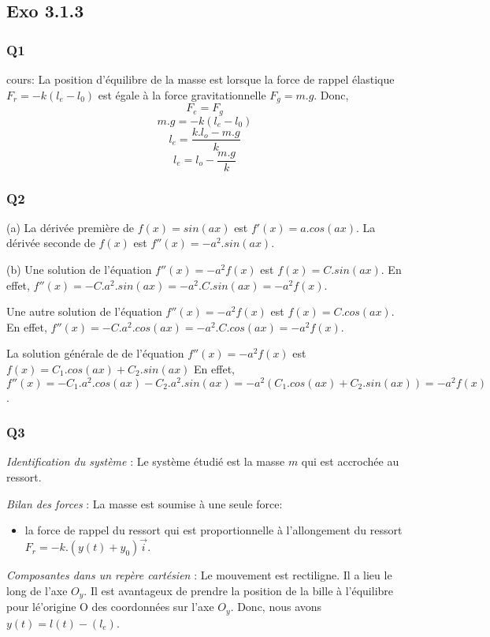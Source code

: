 \documentclass[]{book}
\theoremstyle{definition}
\begin{document}
\subsection*{Exo 3.1.3}
\subsubsection*{Q1}
cours: La position d'\'equilibre de la masse est lorsque la force de rappel \'elastique $F_r=-k(l_e-l_0)$
est \'egale \`a la force gravitationnelle $F_g = m.g$. Donc,
$$F_e = F_g$$
$$m.g = -k(l_e-l_0)$$
$$l_e = \frac{k.l_o - m.g}{k}$$
$$l_e = l_o - \frac{m.g}{k}$$


\subsubsection*{Q2}
(a) La d\'eriv\'ee premi\`ere de $f(x) = sin(ax)$ est $f'(x) = a.cos(ax)$. 
La d\'eriv\'ee seconde de $f(x)$ est $f''(x) = -a^2.sin(ax)$. 

(b) Une solution de l'\'equation $f''(x) = -a^2f(x)$ est $f(x) = C.sin(ax)$. 
En effet, $f''(x) = -C.a^2.sin(ax) = -a^2.C.sin(ax) = -a^2 f(x)$.

Une autre solution de l'\'equation $f''(x) = -a^2f(x)$ est $f(x) = C.cos(ax)$. 
En effet, $f''(x) = -C.a^2.cos(ax) = -a^2.C.cos(ax) = -a^2 f(x)$.

La solution g\'en\'erale de de l'\'equation $f''(x) = -a^2f(x)$ est $f(x) = C_1.cos(ax) + C_2.sin(ax)$
En effet, $f''(x) = -C_1.a^2.cos(ax) - C_2.a^2.sin(ax) = -a^2 (C_1.cos(ax) + C_2.sin(ax)) = -a^2 f(x)$.


\subsubsection*{Q3}
\emph{Identification du syst\`eme} : Le syst\`eme \'etudi\'e est la masse
$m$ qui est accroch\'ee au ressort.


\emph{Bilan des forces} : La masse est soumise \`a une seule force: 
\begin{itemize}
\item la force de rappel du ressort qui est proportionnelle \`a l'allongement
du ressort $F_r = -k.(y(t) + y_0)\overrightarrow{i}$.
\end{itemize}
  

\emph{Composantes dans un rep\`ere cart\'esien} : Le mouvement est rectiligne.
Il a lieu le long de l'axe $O_y$. Il est avantageux de prendre la
position de la bille \`a l'\'equilibre pour l\'e'origine O des coordonn\'ees sur
l'axe $O_y$. Donc, nous avons $y(t) = l(t) - (l_e)$.
\end{document}
